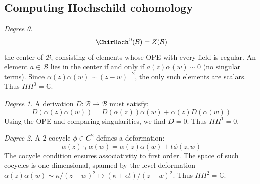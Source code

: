 \subsection{Computing Hochschild cohomology}

\begin{computation}
\label{comp:boson-hochschild}

\emph{Degree 0.}
\[
\ChirHoch^0(\mathcal{B}) = Z(\mathcal{B})
\]
the center of $\mathcal{B}$, consisting of elements whose OPE with every field is regular.
An element $a \in \mathcal{B}$ lies in the center if and only if $a(z)\alpha(w) \sim 0$ (no singular terms).  Since $\alpha(z)\alpha(w) \sim (z-w)^{-2}$, the only such elements are scalars.  Thus $HH^0 = \mathbb{C}$.

\emph{Degree 1.}
A derivation $D: \mathcal{B} \to \mathcal{B}$ must satisfy:
\[
D(\alpha(z)\alpha(w)) = D(\alpha(z))\alpha(w) + \alpha(z)D(\alpha(w))
\]
Using the OPE and comparing singularities, we find $D = 0$. Thus $HH^1 = 0$.

\emph{Degree 2.}
A 2-cocycle $\phi \in C^2$ defines a deformation:
\[
\alpha(z) \cdot_t \alpha(w) = \alpha(z)\alpha(w) + t\phi(z,w)
\]
The cocycle condition ensures associativity to first order. The space of such cocycles
is one-dimensional, spanned by the level deformation $\alpha(z) \alpha(w) \sim \kappa/(z-w)^2 \mapsto (\kappa + \epsilon t)/(z-w)^2$.  Thus $HH^2 = \mathbb{C}$.
\end{computation}

